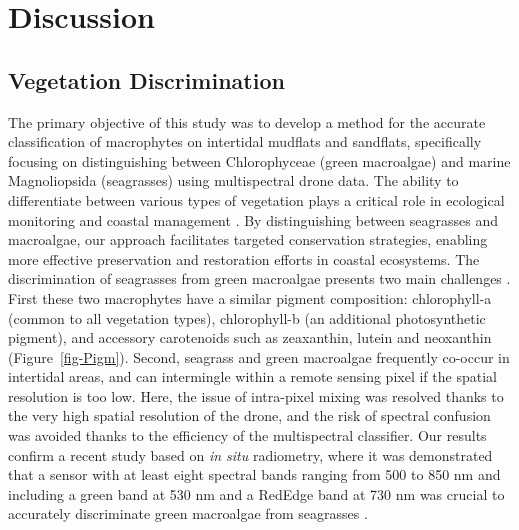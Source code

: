 \documentclass[
  number]{elsarticle}
\begin{document}
\section{Discussion}\label{discussion}

\subsection{Vegetation Discrimination}\label{vegetation-discrimination}

The primary objective of this study was to develop a method for the
accurate classification of macrophytes on intertidal mudflats and
sandflats, specifically focusing on distinguishing between Chlorophyceae
(green macroalgae) and marine Magnoliopsida (seagrasses) using
multispectral drone data. The ability to differentiate between various
types of vegetation plays a critical role in ecological monitoring and
coastal management \citep{WFD2000}. By distinguishing between seagrasses
and macroalgae, our approach facilitates targeted conservation
strategies, enabling more effective preservation and restoration efforts
in coastal ecosystems. The discrimination of seagrasses from green
macroalgae presents two main challenges \citetext{\citealp[
]{oiry2021using}; \citealp[
]{bannari2022}; \citealp{veettil2020opportunities}}. First these two
macrophytes have a similar pigment composition: chlorophyll-a (common to
all vegetation types), chlorophyll-b (an additional photosynthetic
pigment), and accessory carotenoids such as zeaxanthin, lutein and
neoxanthin (Figure~\ref{fig-Pigm}). Second, seagrass and green
macroalgae frequently co-occur in intertidal areas, and can intermingle
within a remote sensing pixel if the spatial resolution is too low.
Here, the issue of intra-pixel mixing was resolved thanks to the very
high spatial resolution of the drone, and the risk of spectral confusion
was avoided thanks to the efficiency of the multispectral classifier.
Our results confirm a recent study based on \emph{in situ} radiometry,
where it was demonstrated that a sensor with at least eight spectral
bands ranging from 500 to 850 nm and including a green band at 530 nm
and a RedEdge band at 730 nm was crucial to accurately discriminate
green macroalgae from seagrasses \citep{Davies2023}.
\end{document}
